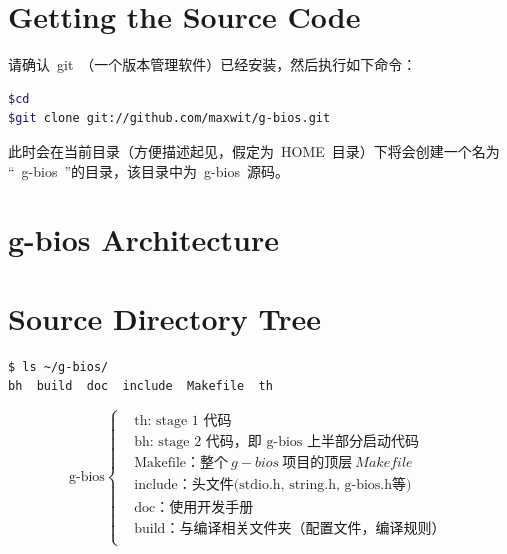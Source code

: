 \documentclass[a4paper,11pt]{book}
\begin{document}
\section{Getting the Source Code}
请确认~git~（一个版本管理软件）已经安装，然后执行如下命令：
\begin{lstlisting}[language=bash,numbers=none]
$cd
$git clone git://github.com/maxwit/g-bios.git
\end{lstlisting}
此时会在当前目录（方便描述起见，假定为~HOME~目录）下将会创建一个名为 ``~g-bios~''的目录，该目录中为~g-bios~源码。

\section{g-bios Architecture}

\section{Source Directory Tree}
\begin{lstlisting}[language=bash, numbers=none]
$ ls ~/g-bios/
bh  build  doc  include  Makefile  th
\end{lstlisting}

\begin{equation*}
\text{g-bios}
\left\{
	\begin{aligned}
	&\text{th: stage 1~代码} \\
	&\text{bh: stage 2~代码，即~g-bios~上半部分启动代码} \\
	&\text{Makefile：} 整个~g-bios~项目的顶层~Makefile~ \\
	&\text{include：头文件(stdio.h, string.h, g-bios.h等)} \\
	&\text{doc：使用开发手册} \\
	&\text{build：与编译相关文件夹（配置文件，编译规则）} \\
	\end{aligned}
\right.
\end{equation*}
\end{document}
